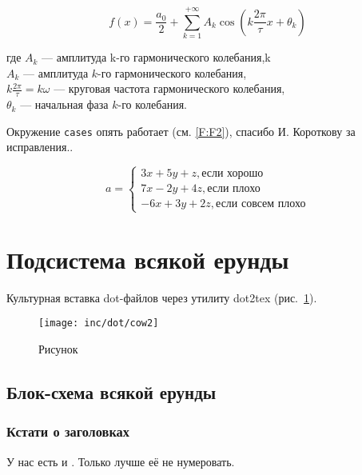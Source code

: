 \begin{eqndesc}
    \begin{equation}\label{eq:fourierrow}
        f(x) = \frac{a_0}{2} + \sum\limits_{k=1}^{+\infty} A_k\cos\left(k\frac{2\pi}{\tau}x+\theta_k\right)
    \end{equation}

    где $A_k$ --- амплитуда  k-го гармонического колебания,k\\
    $A_k$ — амплитуда $k$-го гармонического колебания,\\
    $ k\frac{2\pi}{\tau} = k\omega$ — круговая частота гармонического колебания,\\
    $\theta_k$ — начальная фаза $k$-го колебания.
\end{eqndesc}


Окружение \texttt{cases} опять работает (см. \ref{F:F2}), спасибо И. Короткову за исправления..


\begin{equation}
a= \begin{cases}
 3x + 5y + z, \mbox{если хорошо} \\
 7x - 2y + 4z, \mbox{если плохо}\\
 -6x + 3y + 2z, \mbox{если совсем плохо}
\end{cases}
\label{F:F2}
\end{equation}

\section{Подсистема всякой ерунды}

Культурная вставка dot-файлов через утилиту dot2tex (рис.~\ref{fig:fig02}).

\begin{figure}
  \centering
  \texttt{[image: inc/dot/cow2]}
  \caption{Рисунок}
  \label{fig:fig02}
\end{figure}


\subsection{Блок-схема всякой ерунды}

\subsubsection*{Кстати о заголовках}

У нас есть и . Только лучше её не нумеровать.

